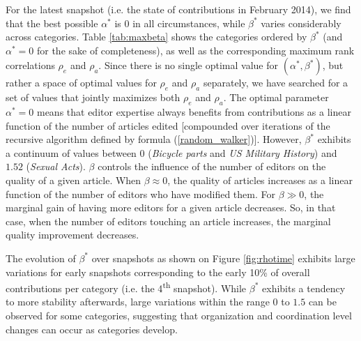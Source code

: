 
For the latest snapshot (i.e. the state of contributions in February 2014), we find that the best possible $\alpha^*$ is $0$ in all circumstances, while $\beta^*$ varies considerably across categories. Table \ref{tab:maxbeta} shows the categories ordered by $\beta^*$ (and $\alpha^*=0$ for the sake of completeness), as well as the corresponding maximum rank correlations $\rho_e$ and $\rho_a$. Since there is no single optimal value for $(\alpha^*,\beta^*)$, but rather a space of optimal values for  $\rho_e$ and $\rho_a$ separately, we have searched for a set of values that jointly maximizes both $\rho_e$ and $\rho_a$. The optimal parameter $\alpha^* = 0$ means that editor expertise always benefits from contributions as a linear function of the number of articles edited [compounded over iterations of the recursive algorithm defined by formula (\ref{random_walker})].  However, $\beta^*$ exhibits a continuum of values between $0$ ({\it Bicycle parts} and {\it US Military History}) and $1.52$ ({\it Sexual Acts}). $\beta$ controls the influence of the number of editors on the quality of a given article. When $\beta \approx 0$, the quality of articles increases as a linear function of the number of editors who have modified them. For $\beta \gg 0$, the marginal gain of having more editors for a given article decreases. So, in that case, when the number of editors touching an article increases, the marginal quality improvement decreases.

The evolution of $\beta^{*}$ over snapshots as shown on Figure \ref{fig:rhotime} exhibits large variations for early snapshots corresponding to the early 10\% of overall contributions per category (i.e. the 4\textsuperscript{th} snapshot). While $\beta^{*}$ exhibits a tendency to more stability afterwards, large variations within the range $0$ to $1.5$ can be observed for some categories, suggesting that organization and coordination level changes can occur as categories develop. 

